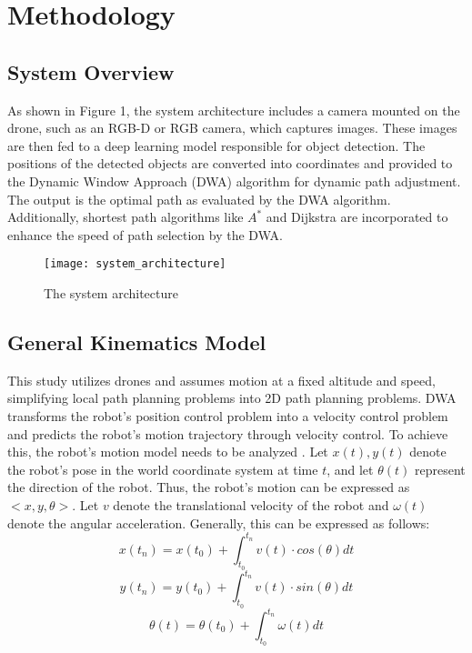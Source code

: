 \documentclass[crop=false]{standalone}
\begin{document}
	\section{Methodology}
	\subsection{System Overview}
	As shown in Figure 1, the system architecture includes a camera mounted on the drone, such as an RGB-D or RGB camera, which captures images. These images are then fed to a deep learning model responsible for object detection. The positions of the detected objects are converted into coordinates and provided to the Dynamic Window Approach (DWA) algorithm for dynamic path adjustment. The output is the optimal path as evaluated by the DWA algorithm. Additionally, shortest path algorithms like $A^*$ and Dijkstra are incorporated to enhance the speed of path selection by the DWA.
	
	\begin{figure*}[thbp!]
		\centering
		\texttt{[image: system\_architecture]}
		\caption{The system architecture}
		\label{fig:system}
	\end{figure*}
	
	\subsection{General Kinematics Model}
	This study utilizes drones and assumes motion at a fixed altitude and speed, simplifying local path planning problems into 2D path planning problems. DWA transforms the robot's position control problem into a velocity control problem and predicts the robot's motion trajectory through velocity control. To achieve this, the robot's motion model needs to be analyzed \cite{fox}. Let $x(t), y(t)$ denote the robot's pose in the world coordinate system at time $t$, and let $\theta(t)$ represent the direction of the robot. Thus, the robot's motion can be expressed as $<x, y, \theta>$. Let $v$ denote the translational velocity of the robot and $\omega(t)$ denote the angular acceleration. Generally, this can be expressed as follows:
	\begin{equation}
		x(t_n)=x(t_0)+ \int_{t_0}^{t_n}v(t) \cdot cos(\theta)dt
	\end{equation}
	\begin{equation}
		y(t_n)=y(t_0)+ \int_{t_0}^{t_n}v(t) \cdot sin(\theta)dt
	\end{equation}
	\begin{equation}
		\theta(t)=\theta(t_0)+\int_{t_0}^{t_n}\omega(t)dt
	\end{equation}
\end{document}
